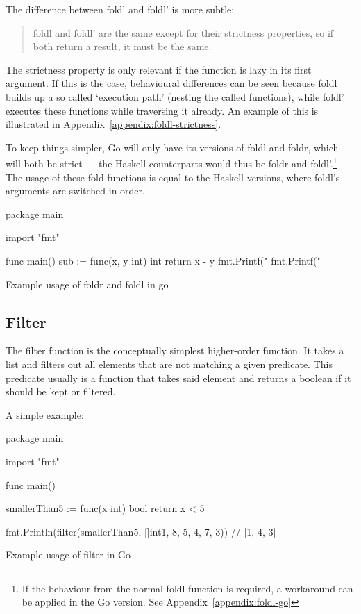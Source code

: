 The difference between foldl and foldl' is more subtle:
\begin{quote}
    foldl and foldl' are the same except for their strictness properties, so if both
    return a result, it must be the same.\autocite{fold-types}
\end{quote}

The strictness property is only relevant if the function is lazy in its first argument.
If this is the case, behavioural differences can be seen because foldl builds up a so
called `execution path' (nesting the called functions), while foldl' executes these
functions while traversing it already. An example of this is illustrated in
Appendix~\ref{appendix:foldl-strictness}.

To keep things simpler, Go will only have its versions of foldl and foldr, which
will both be strict --- the Haskell counterparts would thus be foldr and foldl'.\footnote{
If the behaviour from the normal foldl function is required, a workaround can
be applied in the Go version. See Appendix~\ref{appendix:foldl-go}}
The usage of these fold-functions is equal to the Haskell versions, where foldl's
arguments are switched in order.

\begin{listing}
\begin{gocode}
package main

import "fmt"

func main() {
  sub := func(x, y int) int { return x - y }
  fmt.Printf("%
  fmt.Printf("%
}
\end{gocode}
    \caption{Example usage of foldr and foldl in go}\label{code:fold-go}
\end{listing}
\subsection{Filter}

The filter function is the conceptually simplest higher-order function.
It takes a list and filters out all elements that are not matching
a given predicate.
This predicate usually is a function that takes said element and returns
a boolean if it should be kept or filtered.

A simple example:

\begin{listing}
    \begin{gocode}
package main

import "fmt"

func main() {
  smallerThan5 := func(x int) bool {
    return x < 5
  }

  fmt.Println(filter(smallerThan5, []int{1, 8, 5, 4, 7, 3})) // [1, 4, 3]
}
\end{gocode}
    \caption{Example usage of filter in Go}\label{code:filter-go}
\end{listing}
